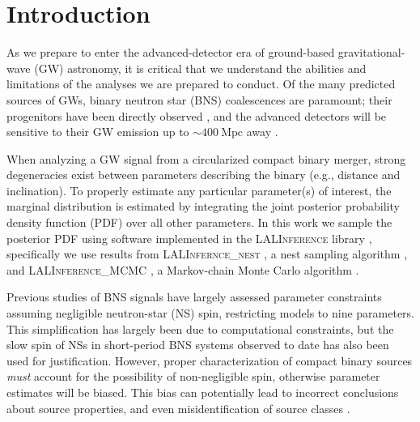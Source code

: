 \section{Introduction}

As we prepare to enter the advanced-detector era of ground-based gravitational-wave (GW) astronomy, it is critical that we understand the abilities and limitations of the analyses we are prepared to conduct. Of the many predicted sources of GWs, binary neutron star (BNS) coalescences are paramount; their progenitors have been directly observed \cite{Lorimer_2008}, and the advanced detectors will be sensitive to their GW emission up to $\sim 400~\mathrm{Mpc}$ away \citep{2013arXiv1304.0670L}.

When analyzing a GW signal from a circularized compact binary merger, strong degeneracies exist between parameters describing the binary (e.g., distance and inclination). To properly estimate any particular parameter(s) of interest, the marginal distribution is estimated by integrating the joint posterior probability density function (PDF) over all other parameters. In this work we sample the posterior PDF using software implemented in the \textsc{LALInference} library \citep{Veitch_2014}, specifically we use results from \textsc{LALInfernce\_nest} \linebreak \citep{Veitch_2010}, a nest sampling algorithm \citep{Skilling2006}, and \textsc{LALInference\_MCMC} \citep{Christensen_2003,R_ver_2006,van_der_Sluys_2008}, a Markov-chain Monte Carlo algorithm \citep[chapter 12]{Gregory2005}.

Previous studies of BNS signals have largely assessed parameter constraints assuming negligible neutron-star (NS) spin, restricting models to nine parameters. This simplification has largely been due to computational constraints, but the slow spin of NSs in short-period BNS systems observed to date \citep[e.g.,][]{Mandel_2010} has also been used for justification. However, proper characterization of compact binary sources \textit{must} account for the possibility of non-negligible spin, otherwise parameter estimates will be biased.  This bias can potentially lead to incorrect conclusions about source properties, and even misidentification of source classes \citep{Buonanno_2009,Berry_2014}.

